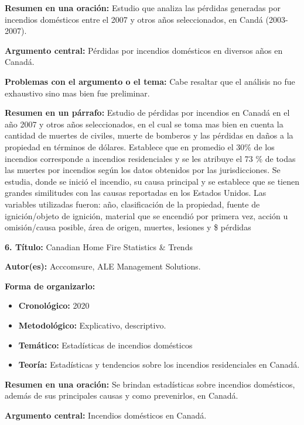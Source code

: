 \documentclass[
  oneside]{memoir}
\begin{document}
\textbf{Resumen en una oración:} Estudio que analiza las pérdidas
generadas por incendios domésticos entre el 2007 y otros años
seleccionados, en Candá (2003-2007).

\textbf{Argumento central:} Pérdidas por incendios domésticos en
diversos años en Canadá.

\textbf{Problemas con el argumento o el tema:} Cabe resaltar que el
análisis no fue exhaustivo sino mas bien fue preliminar.

\textbf{Resumen en un párrafo:} Estudio de pérdidas por incendios en
Canadá en el año 2007 y otros años seleccionados, en el cual se toma mas
bien en cuenta la cantidad de muertes de civiles, muerte de bomberos y
las pérdidas en daños a la propiedad en términos de dólares. Establece
que en promedio el 30\% de los incendios corresponde a incendios
residenciales y se les atribuye el 73 \% de todas las muertes por
incendios según los datos obtenidos por las jurisdicciones. Se estudia,
donde se inició el incendio, su causa principal y se establece que se
tienen grandes similitudes con las causas reportadas en los Estados
Unidos. Las variables utilizadas fueron: año, clasificación de la
propiedad, fuente de ignición/objeto de ignición, material que se
encendió por primera vez, acción u omisión/causa posible, área de
origen, muertes, lesiones y \$ pérdidas

\textbf{ 6. Título:} Canadian Home Fire Statistics \& Trends

\textbf{Autor(es):} Acccomsure, ALE Management Solutions.

\textbf{Forma de organizarlo:}

\begin{itemize}

\item \textbf{Cronológico:} 2020

\item \textbf{Metodológico:} Explicativo, descriptivo.

\item \textbf{Temático:} Estadísticas de incendios domésticos

\item \textbf{Teoría:} Estadísticas y tendencios sobre los incendios residenciales en Canadá.
\end{itemize}

\textbf{Resumen en una oración:} Se brindan estadísticas sobre incendios
domésticos, además de sus principales causas y como prevenirlos, en
Canadá.

\textbf{Argumento central:} Incendios domésticos en Canadá.
\end{document}
